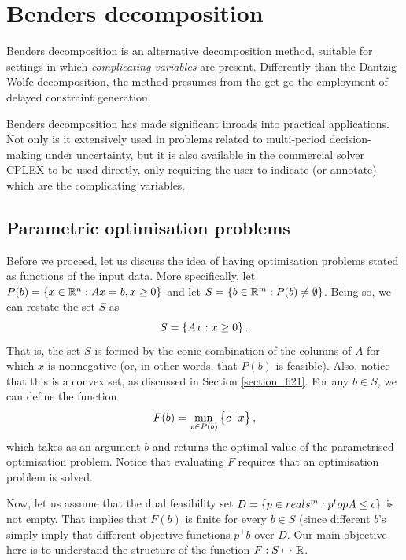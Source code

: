 \section{Benders decomposition}

Benders decomposition is an alternative decomposition method, suitable for settings in which \emph{complicating variables} are present. Differently than the Dantzig-Wolfe decomposition, the method presumes from the get-go the employment of delayed constraint generation. 

Benders decomposition has made significant inroads into practical applications. Not only is it extensively used in problems related to multi-period decision-making under uncertainty, but it is also available in the commercial solver CPLEX to be used directly, only requiring the user to indicate (or annotate) which are the complicating variables. 


\subsection{Parametric optimisation problems} \label{section_731}

Before we proceed, let us discuss the idea of having optimisation problems stated as functions of the input data. More specifically, let $P(b) = \left\{ x \in \mathbb{R}^n : Ax = b, x \geq 0 \right \}$ and let $S = \left\{ b \in \mathbb{R}^m : P(b) \neq \emptyset \right \}$. Being so, we can restate the set $S$ as 
%
\begin{equation*}
	S = \left\{ Ax : x \ge 0 \right \}.
\end{equation*}
%
That is, the set $S$ is formed by the conic combination of the columns of $A$ for which $x$ is nonnegative (or, in other words, that $P(b)$ is feasible). Also, notice that this is a convex set, as discussed in Section \ref{section_621}. For any $b \in S$, we can define the function
%
\begin{equation}
	F(b) = \min_{x \in P(b)} \left\{ c^\top x \right \},	
\end{equation}
%
which takes as an argument $b$ and returns the optimal value of the parametrised optimisation problem. Notice that evaluating $F$ requires that an optimisation problem is solved.

Now, let us assume that the dual feasibility set $D = \left\{ p \in reals^m : p^top A \le c \right \}$ is not empty. That implies that $F(b)$ is finite for every $b \in S$ (since different $b$'s simply imply that different objective functions $p^\top b$ over $D$. Our main objective here is to understand the structure of the function $F: S \mapsto \mathbb{R}$. 

